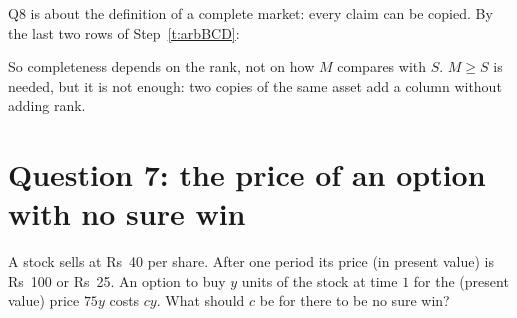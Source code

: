 \begin{steps}[resume]
\item\label{t:complete} Q8 is about the definition of a complete market: every claim can be copied. By the last two rows of Step~\ref{t:arbBCD}:
\begin{deriv}
\end{deriv}
So completeness depends on the rank, not on how $M$ compares with $S$. $M\ge S$ is needed, but it is not enough: two copies of the same asset add a column without adding rank.
\begin{deriv}
\end{deriv}
\end{steps}

\section*{Question 7: the price of an option with no sure win}

\begin{question}
A stock sells at Rs~40 per share. After one period its price (in present value) is Rs~100 or Rs~25. An option to buy $y$ units of the stock at time $1$ for the (present value) price $75y$ costs $cy$. What should $c$ be for there to be no sure win?
\end{question}

